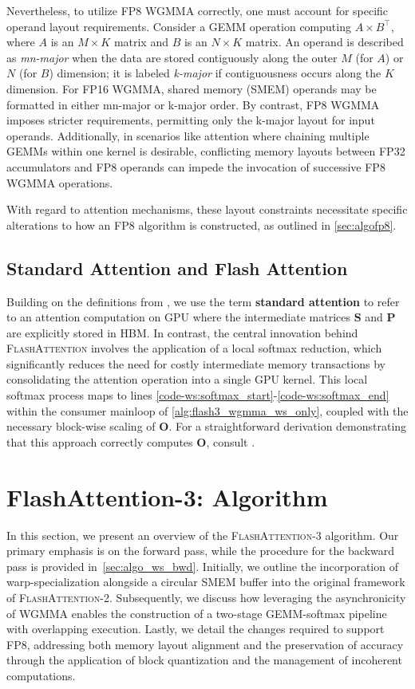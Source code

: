Nevertheless, to utilize FP8 WGMMA correctly, one must account for specific operand layout requirements. Consider a GEMM operation computing $A \times B^{\top}$, where $A$ is an $M\times K$ matrix and $B$ is an $N\times K$ matrix. An operand is described as \emph{mn-major} when the data are stored contiguously along the outer $M$ (for $A$) or $N$ (for $B$) dimension; it is labeled \emph{k-major} if contiguousness occurs along the $K$ dimension. For FP16 WGMMA, shared memory (SMEM) operands may be formatted in either mn-major or k-major order. By contrast, FP8 WGMMA imposes stricter requirements, permitting only the k-major layout for input operands. Additionally, in scenarios like attention where chaining multiple GEMMs within one kernel is desirable, conflicting memory layouts between FP32 accumulators and FP8 operands can impede the invocation of successive FP8 WGMMA operations.

With regard to attention mechanisms, these layout constraints necessitate specific alterations to how an FP8 algorithm is constructed, as outlined in \cref{sec:algofp8}.

\subsection{Standard Attention and Flash Attention} Building on the definitions from \citet{dao2022flashattention}, we use the term \textbf{standard attention} to refer to an attention computation on GPU where the intermediate matrices $\mathbf{S}$ and $\mathbf{P}$ are explicitly stored in HBM. In contrast, the central innovation behind \textsc{FlashAttention} involves the application of a local softmax reduction, which significantly reduces the need for costly intermediate memory transactions by consolidating the attention operation into a single GPU kernel. This local softmax process maps to lines \ref{code-ws:softmax_start}-\ref{code-ws:softmax_end} within the consumer mainloop of \cref{alg:flash3_wgmma_ws_only}, coupled with the necessary block-wise scaling of $\mathbf{O}$. For a straightforward derivation demonstrating that this approach correctly computes $\mathbf{O}$, consult \cite[\S 2.3.1]{dao2023flashattention2}.

\section{FlashAttention-3: Algorithm}
\label{sec:algo}

In this section, we present an overview of the \textsc{FlashAttention-3} algorithm. Our primary emphasis is on the forward pass, while the procedure for the backward pass is provided in~\cref{sec:algo_ws_bwd}. Initially, we outline the incorporation of warp-specialization alongside a circular SMEM buffer into the original framework of \textsc{FlashAttention-2}. Subsequently, we discuss how leveraging the asynchronicity of WGMMA enables the construction of a two-stage GEMM-softmax pipeline with overlapping execution. Lastly, we detail the changes required to support FP8, addressing both memory layout alignment and the preservation of accuracy through the application of block quantization and the management of incoherent computations.

